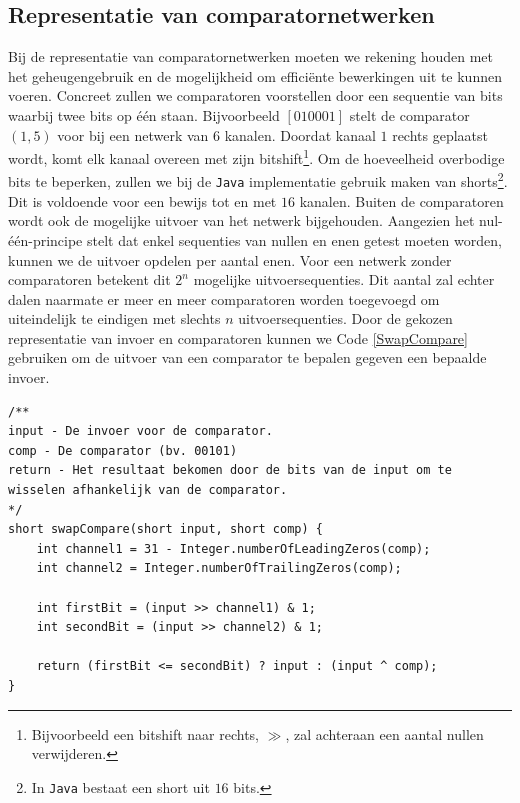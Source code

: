 \documentclass{article}
\begin{document}
\subsection{Representatie van comparatornetwerken}\label{RepresentatieVanComparatorNetwerken}
Bij de representatie van comparatornetwerken moeten we rekening houden met het geheugengebruik en de mogelijkheid om effici\"ente bewerkingen uit te kunnen voeren.
Concreet zullen we comparatoren voorstellen door een sequentie van bits waarbij twee bits op \'e\'en staan.
Bijvoorbeeld  $ \left[ 0 1 0 0 0 1\right]$ stelt de comparator $\left(1,5\right)$ voor bij een netwerk van $6$ kanalen.
Doordat kanaal $1$ rechts geplaatst wordt, komt elk kanaal overeen met zijn bitshift\footnote{Bijvoorbeeld een bitshift naar rechts, $\gg$, zal achteraan een aantal nullen verwijderen.}.
Om de hoeveelheid overbodige bits te beperken, zullen we bij de \texttt{Java} implementatie gebruik maken van shorts\footnote{In \texttt{Java} bestaat een short uit $16$ bits.}.
Dit is voldoende voor een bewijs tot en met $16$ kanalen.
Buiten de comparatoren wordt ook de mogelijke uitvoer van het netwerk bijgehouden.
Aangezien het nul-\'e\'en-principe stelt dat enkel sequenties van nullen en enen getest moeten worden, kunnen we de uitvoer opdelen per aantal enen.
Voor een netwerk zonder comparatoren betekent dit $2^n$ mogelijke uitvoersequenties.
Dit aantal zal echter dalen naarmate er meer en meer comparatoren worden toegevoegd om uiteindelijk te eindigen met slechts $n$ uitvoersequenties.
Door de gekozen representatie van invoer en comparatoren kunnen we Code \ref{SwapCompare} gebruiken om de uitvoer van een comparator te bepalen gegeven een bepaalde invoer.
\begin{lstlisting}[caption={swapCompare},label=SwapCompare]
/**
input - De invoer voor de comparator.
comp - De comparator (bv. 00101)
return - Het resultaat bekomen door de bits van de input om te wisselen afhankelijk van de comparator.
*/
short swapCompare(short input, short comp) {
	int channel1 = 31 - Integer.numberOfLeadingZeros(comp);
	int channel2 = Integer.numberOfTrailingZeros(comp);
	
	int firstBit = (input >> channel1) & 1;
	int secondBit = (input >> channel2) & 1;
	
	return (firstBit <= secondBit) ? input : (input ^ comp);
}
\end{lstlisting}
\end{document}
